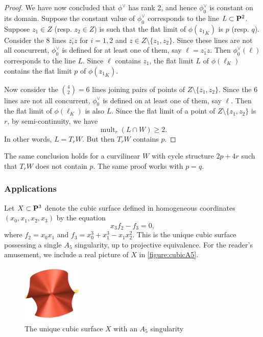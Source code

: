 \documentclass[12pt,reqno]{amsart}
\DeclareMathOperator{\mult}{mult}
\numberwithin{equation}{section}
\begin{document}
\begin{proof}
  We have now concluded that $\phi^\vee$ has rank 2, and hence $\phi_0^\vee$ is constant on its domain.
  Suppose the constant value of $\phi_0^\vee$ corresponds to the line $L \subset \P^2$.
  Suppose $z_1 \in Z$ (resp. $z_2 \in Z$) is such that the flat limit of $\phi({z_1}_K)$ is $p$ (resp. $q$).
  Consider the 8 lines $\overline {z_i z}$ for $i= 1,2$ and $z \in Z \setminus \{z_1,z_2\}$.
  Since these lines are not all concurrent, $\phi_0^\vee$ is defined for at least one of them, say $\ell = \overline {z_1 z}$.
  Then $\phi^\vee_0(\ell)$ corresponds to the line $L$.
  Since $\ell$ contains $z_1$, the flat limit $L$ of $\phi(\ell_K)$ contains the flat limit $p$ of $\phi({z_1}_K)$.

  Now consider the ${4 \choose 2} = 6$ lines joining pairs of points of $Z \setminus \{z_1,z_2\}$.
  Since the 6 lines are not all concurrent, $\phi_0^\vee$ is defined on at least one of them, say $\ell$.
  Then the flat limit of $\phi(\ell_K)$ is also $L$.
  Since the flat limit of a point of $Z \setminus \{z_1,z_2\}$ is $r$, by semi-continuity, we have
  \[ \mult_r(L \cap W) \geq 2.\]
  In other words, $L = T_rW$.
  But then $T_rW$ contains $p$.
\end{proof}
\begin{remark}\label{prop:2p4r}
  The same conclusion holds for a curvilinear $W$ with cycle structure $2p + 4r$ such that $T_rW$ does not contain $p$.
  The same proof works with $p = q$.
\end{remark}

\subsubsection{Applications}
Let $X \subset \P^{3}$ denote the cubic surface defined in homogeneous coordinates $\left(x_{0}, x_{1}, x_{2}, x_{3}\right)$ by the equation \[x_{3}f_{2} - f_{3} = 0,\] where $f_{2} = x_{0}x_{1}$ and $f_{3} = x_{0}^3 + x_{1}^{3}-x_{1}x_{2}^{2}$.
This is the unique cubic surface possessing a single $A_5$ singularity, up to projective equivalence.
For the reader's amusement, we include a real picture of $X$ in \autoref{figure:cubicA5}.
\begin{figure}
  \centering
  \includegraphics[width=0.25\textwidth]{cubicA5}
  \caption{The unique cubic surface $X$ with an $A_5$ singularity}
  \label{figure:cubicA5}
\end{figure}
\end{document}
